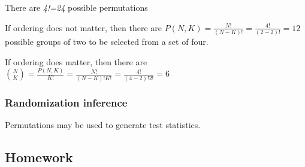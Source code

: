 \documentclass[
  letterpaper,
  DIV=11,
  numbers=noendperiod,
  oneside]{scrartcl}
\begin{document}
There are \emph{4!=24} possible permutations

If ordering does not matter, then there are
\(P(N,K)=\frac{N!}{ (N-K)!}=\frac{4!}{(2-2)!}=12\) possible groups of
two to be selected from a set of four.

If ordering does matter, then there are
\(\binom{N}{K}=\frac{P(N,K)}{K!}=\frac{N!}{(N-K)!K!}=\frac{4!}{(4-2)!2!}=6\)

\hypertarget{randomization-inference}{%
\subsubsection{Randomization inference}\label{randomization-inference}}

Permutations may be used to generate test statistics.

\hypertarget{homework}{%
\subsection{Homework}\label{homework}}
\end{document}
